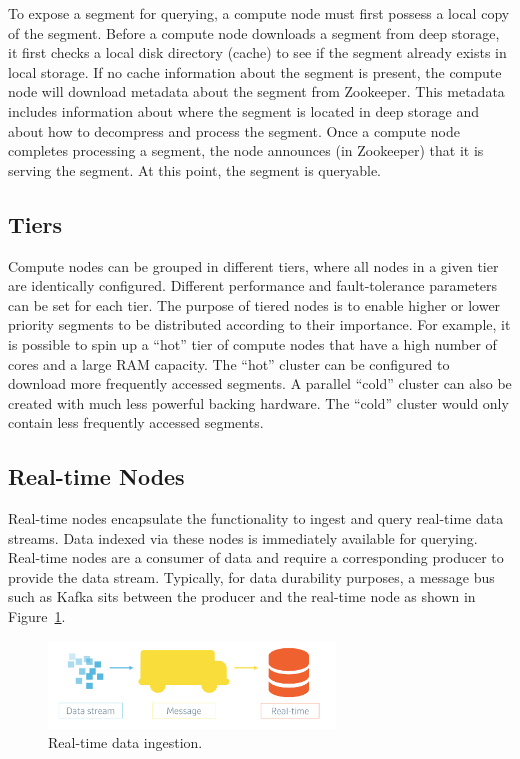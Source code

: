 \documentclass{vldb}
\begin{document}
To expose a segment for querying, a compute node must first possess a
local copy of the segment. Before a compute node downloads a segment
from deep storage, it first checks a local disk directory (cache) to
see if the segment already exists in local storage. If no cache
information about the segment is present, the compute node will
download metadata about the segment from Zookeeper. This metadata
includes information about where the segment is located in deep
storage and about how to decompress and process the segment. Once a
compute node completes processing a segment, the node announces (in
Zookeeper) that it is serving the segment. At this point, the segment
is queryable.

\subsection{Tiers}
\label{sec:tiers}
Compute nodes can be grouped in different tiers, where all nodes in a
given tier are identically configured. Different performance and
fault-tolerance parameters can be set for each tier. The purpose of
tiered nodes is to enable higher or lower priority segments to be
distributed according to their importance. For example, it is possible
to spin up a “hot” tier of compute nodes that have a high number of
cores and a large RAM capacity. The “hot” cluster can be configured to
download more frequently accessed segments. A parallel “cold” cluster
can also be created with much less powerful backing hardware. The
“cold” cluster would only contain less frequently accessed segments.

\subsection{Real-time Nodes}
Real-time nodes encapsulate the functionality to ingest and query
real-time data streams. Data indexed via these nodes is immediately
available for querying. Real-time nodes are a consumer of data and
require a corresponding producer to provide the data
stream. Typically, for data durability purposes, a message bus such as
Kafka \cite{kreps2011kafka} sits between the producer and the real-time node as shown
in Figure~\ref{fig:data-ingestion}.

\begin{figure}
\centering
\includegraphics[width = 3in]{druid_message_bus}
\caption{Real-time data ingestion.}
\label{fig:data-ingestion}
\end{figure}
\end{document}
